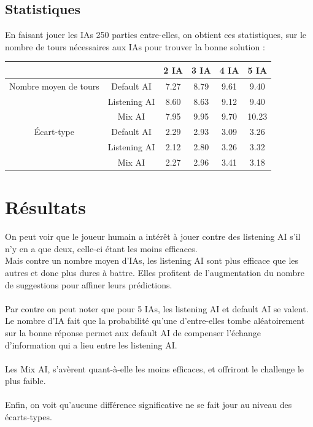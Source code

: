 \documentclass[a4paper,10pt]{article}
\begin{document}
	\subsection{Statistiques}
		En faisant jouer les IAs 250 parties entre-elles, on obtient ces statistiques, sur le nombre de tours nécessaires aux IAs pour trouver la bonne solution :
		\begin{center}
			\begin{tabular}{|c|c|c|c|c|c|} \hline
		  				&								 &	 	 2 IA 		 &  3 IA 	 	 &   4 IA 	 	&   5 IA 	\\ \hline
			Nombre moyen de tours &	Default AI		 & 	 	7.27		& 	8.79		& 	9.61	 	& 	9.40\\ \hline
			&	Listening AI 		 & 	 	8.60		& 	8.63		& 	9.12	 	& 	9.40\\ \hline
			 &	Mix AI		 & 	 	7.95		& 	9.95		& 	9.70	 	& 	10.23\\ \hline \hline
			Écart-type &	Default AI				&		2.29	 	& 	2.93	 	& 	3.09	 	& 	3.26\\ \hline 
			 &	Listening AI 					&		2.12	 	& 	2.80	 	& 	3.26	 	& 	3.32\\ \hline
				& Mix AI					&		2.27	 	& 	2.96	 	& 	3.41	 	& 	3.18\\ \hline
			\end{tabular} \end{center}



\section{Résultats}

 	On peut voir que le joueur humain a intérêt à jouer contre des listening AI s'il n'y en a que deux, celle-ci étant les moins efficaces.\\
 	Mais contre un nombre moyen d'IAs, les listening AI sont plus efficace que les autres et donc plus dures à battre.
 	Elles profitent de l'augmentation du nombre de suggestions pour affiner leurs prédictions.\\
 	~\\
 	Par contre on peut noter que pour 5 IAs, les listening AI et default AI se valent. Le nombre d'IA fait que la probabilité qu'une d'entre-elles tombe aléatoirement sur la bonne réponse permet aux default AI de compenser l'échange d'information qui a lieu entre les listening AI.\\
 	~\\
 	Les Mix AI, s'avèrent quant-à-elle les moins efficaces, et offriront le challenge le plus faible.\\
 	~\\
 	Enfin, on voit qu'aucune différence significative ne se fait jour au niveau des écarts-types.
 	
\end{document}
